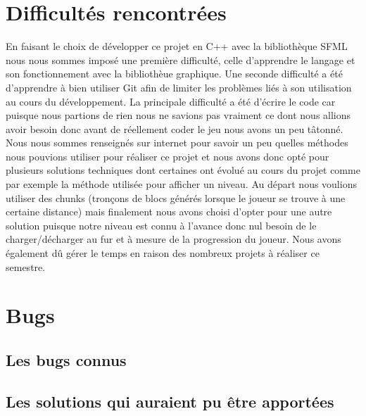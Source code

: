 \documentclass[a4paper,11pt]{article}
\begin{document}
\section{Difficultés rencontrées}
En faisant le choix de développer ce projet en C++ avec la bibliothèque SFML nous nous sommes imposé une première difficulté, celle d'apprendre le langage et son fonctionnement avec la bibliothèue graphique.
\newline Une seconde difficulté a été d'apprendre à bien utiliser Git afin de limiter les problèmes liés à son utilisation au cours du développement.
\newline La principale difficulté a été d'écrire le code car puisque nous partions de rien nous ne savions pas vraiment ce dont nous allions avoir besoin donc avant de réellement coder le jeu nous avons un peu tâtonné. Nous nous sommes renseignés sur internet pour savoir un peu quelles méthodes nous pouvions utiliser pour réaliser ce projet et nous avons donc opté pour plusieurs solutions techniques dont certaines ont évolué au cours du projet comme par exemple la méthode utilisée pour afficher un niveau. Au départ nous voulions utiliser des chunks (tronçons de blocs générés lorsque le joueur se trouve à une certaine distance) mais finalement nous avons choisi d'opter pour une autre solution puisque notre niveau est connu à l'avance donc nul besoin de le charger/décharger au fur et à mesure de la progression du joueur.
\newline Nous avons également dû gérer le temps en raison des nombreux projets à réaliser ce semestre.


\section{Bugs}
	\subsection{Les bugs connus}
    
    \subsection{Les solutions qui auraient pu être apportées}
    
\end{document}
